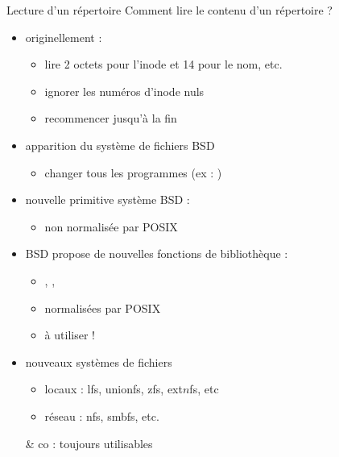 \begin {frame} {Lecture d'un répertoire}
    Comment lire le contenu d'un répertoire ?

    \begin {itemize}
	\item originellement :  \\
	    \begin {itemize}
		\item lire 2 octets pour l'inode et 14 pour le nom, etc.
		\item ignorer les numéros d'inode nuls
		\item recommencer jusqu'à la fin
	    \end {itemize}

	\item apparition du système de fichiers BSD
	    \begin {itemize}
		\item changer tous les programmes (ex : )
	    \end {itemize}

	\item nouvelle primitive système BSD : 
	    \begin {itemize}
		\item non normalisée par POSIX
	    \end {itemize}
	
	\item BSD propose de nouvelles fonctions de bibliothèque :
	    \begin {itemize}
		\item {}, , 
		\item normalisées par POSIX
		\item \implique à utiliser !
	    \end {itemize}

	\item nouveaux systèmes de fichiers
	    \begin {itemize}
		\item locaux : lfs, unionfs, zfs, ext$n$fs, etc
		\item réseau : nfs, smbfs, etc.
	    \end {itemize}
	    \implique {} \& co : toujours utilisables
    \end {itemize}
\end {frame}

